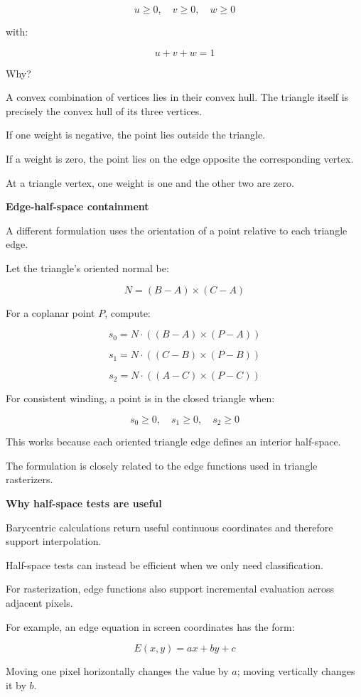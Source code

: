\[
\boxed{u\ge0,\quad v\ge0,\quad w\ge0}
\]

with:

\[
u+v+w=1
\]

Why?

A convex combination of vertices lies in their convex hull. The triangle itself is precisely the convex hull of its three vertices.

If one weight is negative, the point lies outside the triangle.

If a weight is zero, the point lies on the edge opposite the corresponding vertex.

At a triangle vertex, one weight is one and the other two are zero.

\textbf{Edge-half-space containment}

A different formulation uses the orientation of a point relative to each triangle edge.

Let the triangle's oriented normal be:

\[
N=(B-A)\times(C-A)
\]

For a coplanar point \(P\), compute:

\[
s_0=N\cdot((B-A)\times(P-A))
\]

\[
s_1=N\cdot((C-B)\times(P-B))
\]

\[
s_2=N\cdot((A-C)\times(P-C))
\]

For consistent winding, a point is in the closed triangle when:

\[
s_0\ge0,\quad s_1\ge0,\quad s_2\ge0
\]

This works because each oriented triangle edge defines an interior half-space.

The formulation is closely related to the edge functions used in triangle rasterizers.

\textbf{Why half-space tests are useful}

Barycentric calculations return useful continuous coordinates and therefore support interpolation.

Half-space tests can instead be efficient when we only need classification.

For rasterization, edge functions also support incremental evaluation across adjacent pixels.

For example, an edge equation in screen coordinates has the form:

\[
E(x,y)=ax+by+c
\]

Moving one pixel horizontally changes the value by \(a\); moving vertically changes it by \(b\).

